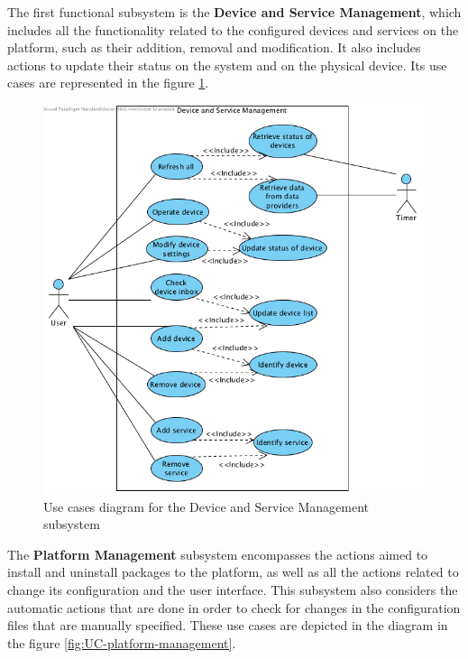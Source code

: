 The first functional subsystem is the \textbf{Device and Service Management}, which includes all the functionality related to the 
configured devices and services on the platform, such as their addition, removal and modification. It also includes actions
to update their status on the system and on the physical device. Its use cases are represented in the figure 
\ref{fig:UC-device-and-service-management}.

\begin{figure}
	\centering
	\includegraphics[width=1\textwidth]{images/Chapter_06/UC-device-and-service-management.png}
	\caption{Use cases diagram for the Device and Service Management subsystem}
	\label{fig:UC-device-and-service-management}
\end{figure}

The \textbf{Platform Management} subsystem encompasses the actions aimed to install and uninstall packages to the platform, as well
as all the actions related to change its configuration and the user interface. This subsystem also considers the automatic actions that
are done in order to check for changes in the configuration files that are manually specified. These use cases are depicted in the diagram
in the figure \ref{fig:UC-platform-management}.

